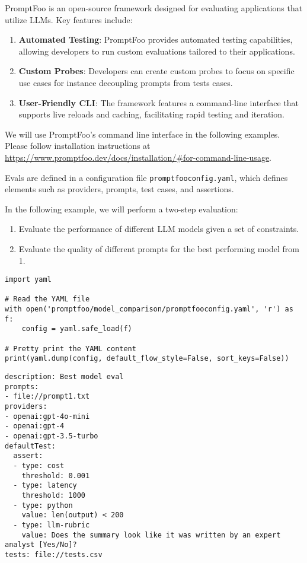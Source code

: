 PromptFoo  is an open-source framework designed for evaluating applications that utilize LLMs. Key features include:

\begin{enumerate}
    \item \textbf{Automated Testing}: PromptFoo provides automated testing capabilities, allowing developers to run custom evaluations tailored to their applications.

    \item \textbf{Custom Probes}: Developers can create custom probes to focus on specific use cases for instance decoupling prompts from tests cases.

    \item \textbf{User-Friendly CLI}: The framework features a command-line interface that supports live reloads and caching, facilitating rapid testing and iteration.
\end{enumerate}

We will use PromptFoo's command line interface in the following examples. Please follow installation instructions at \url{https://www.promptfoo.dev/docs/installation/#for-command-line-usage}.

Evals are defined in a configuration file \texttt{promptfooconfig.yaml}, which defines elements such as providers, prompts, test cases, and assertions.

In the following example, we will perform a two-step evaluation:

\begin{enumerate}
    \item Evaluate the performance of different LLM models given a set of constraints.
    \item Evaluate the quality of different prompts for the best performing model from 1.
\end{enumerate}


\begin{verbatim}
import yaml

# Read the YAML file
with open('promptfoo/model_comparison/promptfooconfig.yaml', 'r') as f:
    config = yaml.safe_load(f)

# Pretty print the YAML content 
print(yaml.dump(config, default_flow_style=False, sort_keys=False))
\end{verbatim}

\begin{verbatim}
description: Best model eval
prompts:
- file://prompt1.txt
providers:
- openai:gpt-4o-mini
- openai:gpt-4
- openai:gpt-3.5-turbo
defaultTest:
  assert:
  - type: cost
    threshold: 0.001
  - type: latency
    threshold: 1000
  - type: python
    value: len(output) < 200
  - type: llm-rubric
    value: Does the summary look like it was written by an expert analyst [Yes/No]?
tests: file://tests.csv
\end{verbatim}

